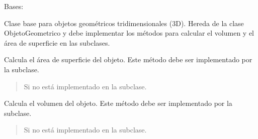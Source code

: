 \documentclass[letterpaper,10pt,spanish]{sphinxmanual}
\begin{document}

\begin{fulllineitems}
\label{\detokenize{pr8:pr8.3.Objeto3D}}
\pysigstartsignatures
{}
\pysigstopsignatures
\sphinxAtStartPar
Bases: {\hyperref[\detokenize{pr8:pr8.3.ObjetoGeometrico}]{}}

\sphinxAtStartPar
Clase base para objetos geométricos tridimensionales (3D).
Hereda de la clase ObjetoGeometrico y debe implementar los métodos
para calcular el volumen y el área de superficie en las subclases.

\begin{fulllineitems}
\label{\detokenize{pr8:pr8.3.Objeto3D.area_superficie}}
\pysigstartsignatures
{}
\pysigstopsignatures
\sphinxAtStartPar
Calcula el área de superficie del objeto. Este método debe ser implementado por la subclase.
\begin{quote}\begin{description}
\sphinxAtStartPar
{} \textendash{} Si no está implementado en la subclase.

\end{description}\end{quote}

\end{fulllineitems}


\begin{fulllineitems}
\label{\detokenize{pr8:pr8.3.Objeto3D.volumen}}
\pysigstartsignatures
{}
\pysigstopsignatures
\sphinxAtStartPar
Calcula el volumen del objeto. Este método debe ser implementado por la subclase.
\begin{quote}\begin{description}
\sphinxAtStartPar
{} \textendash{} Si no está implementado en la subclase.

\end{description}\end{quote}

\end{fulllineitems}


\end{fulllineitems}
\end{document}

